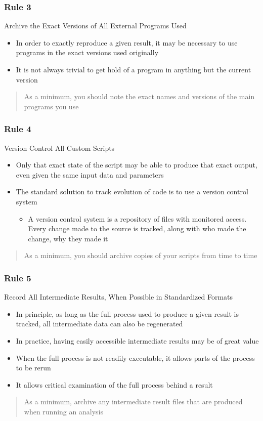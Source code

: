 \documentclass{beamer}
\begin{document}
\begin{frame}
\frametitle{Rule 3}
{\sc Archive the Exact Versions of All External Programs Used}
\begin{itemize}
    \item In order to exactly reproduce a given result, it may be necessary to use programs in the exact versions used originally
    \item It is not always trivial to get hold of a program in anything but the current version
\end{itemize}
\begin{quote}
    As a minimum, you should note the exact names and versions of the main programs you use
\end{quote}
\end{frame}
\begin{frame}
\frametitle{Rule 4}
{\sc Version Control All Custom Scripts}
\begin{itemize}
    \item Only that exact state of the script may be able to produce that exact output, even given the same input data and parameters
    \item The standard solution to track evolution of code is to use a version control system
        \begin{itemize}[]
            \item \scriptsize A version control system is a repository of files with monitored access. Every change made to the source is tracked, along with who made the change, why they made it
        \end{itemize}
\end{itemize}
\begin{quote}
    As a minimum, you should archive copies of your scripts from time to time
\end{quote}
\end{frame}
\begin{frame}
\frametitle{Rule 5}
{\sc Record All Intermediate Results, When Possible in Standardized Formats}
\begin{itemize}
    \item In principle, as long as the full process used to produce a given result is tracked, all intermediate data can also be regenerated
    \item In practice, having easily accessible intermediate results may be of great value
    \item When the full process is not readily executable, it allows parts of the process to be rerun
    \item It allows critical examination of the full process behind a result
\end{itemize}
\begin{quote}
    As a minimum, archive any intermediate result files that are produced when running an analysis
\end{quote}
\end{frame}
\end{document}
